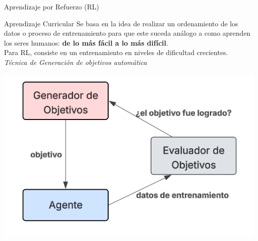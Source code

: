 \documentclass[spanish,10pt]{beamer}
\begin{document}
\begin{frame}{Aprendizaje por Refuerzo (RL)}
\begin{figure}[h!]
		\end{figure}
		
	\end{frame}
	
	\begin{frame}{Aprendizaje Curricular}
		Se basa en la idea de realizar un ordenamiento de los datos o proceso de entrenamiento para que este suceda análogo a como aprenden los seres humanos: \textbf{de lo más fácil a lo más difícil}.\\[1em]
		
		Para RL, consiste en un entrenamiento en niveles de dificultad crecientes.\\[1em]
		
		\textit{Técnica de Generación de objetivos automática}

				\centering
				\includegraphics[width=0.5\linewidth]{images/marco-teorico/curr-4}

	\end{frame}
	
\end{document}
